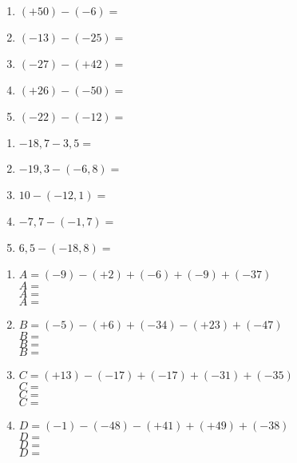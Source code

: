 \documentclass[11pt]{article}
\begin{document}
\newpage

\begin{multicols}{2}

\begin{exercicedevoir}[5][Calculer]
\begin{enumerate}[itemsep=1em]
\item $(+50) - (-6)=$\dotfill
\item $(-13) - (-25)=$\dotfill
\item $(-27) - (+42)=$\dotfill
\item $(+26) - (-50)=$\dotfill
\item $(-22) - (-12)=$\dotfill
\end{enumerate}
\end{exercicedevoir}

\begin{exercicedevoir}[5][Calculer]
\begin{enumerate}[itemsep=1em]
\item $-18{,}7 - 3{,}5=$\dotfill
\item $-19{,}3 - (-6{,}8)=$\dotfill
\item $10 - (-12{,}1)=$\dotfill
\item $-7{,}7 - (-1{,}7)=$\dotfill
\item $6{,}5 - (-18{,}8)=$\dotfill
\end{enumerate}
\end{exercicedevoir}
\end{multicols}

\begin{exercicedevoir}
\begin{multicols}{2}
\begin{enumerate}[itemsep=1em,label={}]
\item  $ A =  (-9)-(+2)+(-6)+(-9)+(-37)$\\$ A =$ \\$ A =$\\$ A =$
\item  $ B =  (-5)-(+6)+(-34)-(+23)+(-47)$\\$ B =$ \\$ B =$\\$ B =$
\item  $ C =  (+13)-(-17)+(-17)+(-31)+(-35)$\\$ C =$ \\$ C =$\\$ C =$
\item  $ D =  (-1)-(-48)-(+41)+(+49)+(-38)$\\$ D =$ \\$ D =$\\$ D =$
\end{enumerate}
\end{multicols}
\end{exercicedevoir}
\end{document}

